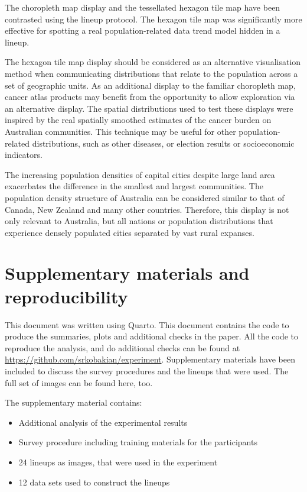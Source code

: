\documentclass[
doublespace,
  times]{anzsauth}
\providecommand{\tightlist}{%
  \setlength{\itemsep}{0pt}\setlength{\parskip}{0pt}}
\begin{document}
The choropleth map display and the tessellated hexagon tile map have
been contrasted using the lineup protocol. The hexagon tile map was
significantly more effective for spotting a real population-related data
trend model hidden in a lineup.

The hexagon tile map display should be considered as an alternative
visualisation method when communicating distributions that relate to the
population across a set of geographic units. As an additional display to
the familiar choropleth map, cancer atlas products may benefit from the
opportunity to allow exploration via an alternative display. The spatial
distributions used to test these displays were inspired by the real
spatially smoothed estimates of the cancer burden on Australian
communities. This technique may be useful for other population-related
distributions, such as other diseases, or election results or
socioeconomic indicators.

The increasing population densities of capital cities despite large land
area exacerbates the difference in the smallest and largest communities.
The population density structure of Australia can be considered similar
to that of Canada, New Zealand and many other countries. Therefore, this
display is not only relevant to Australia, but all nations or population
distributions that experience densely populated cities separated by vast
rural expanses.

\section*{Supplementary materials and
reproducibility}\label{supplementary-materials-and-reproducibility}

This document was written using \textsf{Quarto}. This document contains
the code to produce the summaries, plots and additional checks in the
paper. All the code to reproduce the analysis, and do additional checks
can be found at \url{https://github.com/srkobakian/experiment}.
Supplementary materials have been included to discuss the survey
procedures and the lineups that were used. The full set of images can be
found here, too.

The supplementary material contains:

\begin{itemize}
\tightlist
\item
  Additional analysis of the experimental results
\item
  Survey procedure including training materials for the participants
\item
  24 lineups as images, that were used in the experiment
\item
  12 data sets used to construct the lineups
\end{itemize}
\end{document}
